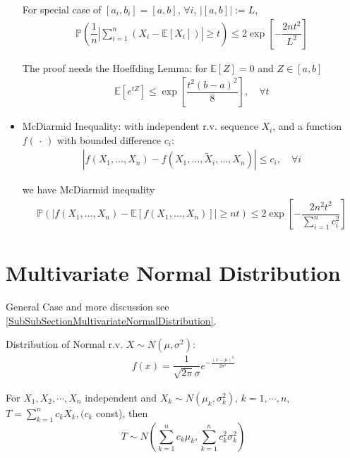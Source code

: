 \begin{itemize}
    For special case of $ [a_i,b_i]=[a,b] $, $ \forall i $, $ |[a,b]|:=L $,
    \begin{align}
        \mathbb{P}\left( \dfrac{1}{n}\left\vert \sum_{i=1}^n\left(X_i-\mathbb{E}\left[ X_i \right] \right)  \right\vert \geq t   \right)  \leq 2\exp\left[ -\dfrac{2nt^2}{L^2} \right]
    \end{align}
    
    

    The proof needs the Hoeffding Lemma: for $ \mathbb{E}\left[ Z \right]=0  $ and $ Z\in[a,b] $
    \begin{align}
        \mathbb{E}\left[ e^{tZ} \right]\leq \exp\left[ \dfrac{t^2(b-a)^2}{8} \right],\quad \forall t  
    \end{align}
    
    \item McDiarmid Inequality: with independent r.v. sequence $ X_i $, and a function $ f(\, \cdot \, ) $ with bounded difference $ c_i $:
    \begin{align}
        \left| f\left(X_1,\ldots,X_{n}\right)- f\left(X_1,\ldots,\tilde{X}_i,\ldots,X_{n}\right) \right| \leq c_i,\quad \forall i
    \end{align}

    we have McDiarmid inequality
    \begin{align}
        \mathbb{P}\left( \left| f(X_1,\ldots,X_n)-\mathbb{E}\left[ f(X_1,\ldots,X_n) \right]  \right| \geq nt\right) \leq 2\exp\left[ -\dfrac{2n^2t^2}{\sum_{i=1}^nc_i^2} \right] 
    \end{align}
    
\end{itemize}


\section{Multivariate Normal Distribution}\label{SubsectionDerivationMultivariateNormal}
    General Case and more discussion see \autoref{SubSubSectionMultivariateNormalDistribution}.

    Distribution of Normal r.v. $ X\sim N(\mu ,\sigma ^2) $:
    \begin{align}
        f(x)=\dfrac{1}{\sqrt{2\pi}\sigma }e^{-\frac{(x-\mu )^2}{2\sigma ^2}} 
    \end{align}
    
    

    For $X_1,X_2,\cdots,X_n$ independent and $X_k\sim N(\mu_k,\sigma^2_k),\, k=1,\cdots,n$, $T={\displaystyle\sum_{k=1}^n c_kX_k}, (c_k$ const), then
    \begin{equation}
        T\sim N(\sum_{k=1}^nc_k\mu_k,\sum_{k=1}^n c_k^2\sigma^2_k)    
    \end{equation}

